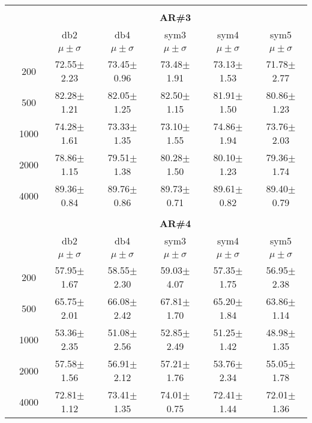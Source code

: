 \begin{table}[H]
\begin{tabular}{|c|c|c c c c c|}
\\ \midrule
\multicolumn{7}{c}{}\\ 



\cline{3-7}
\multicolumn{2}{c|}{\multirow{3}{*}{}} & \multicolumn{5}{c|}{\textbf{AR\#3}}   \\\cline{3-7} 

\multicolumn{2}{c|}{}  & db2 & db4 & sym3 & sym4 & sym5 \\\cline{3-7}
\multicolumn{2}{c|}{}& $\mu \pm \sigma$ & $\mu \pm \sigma$ & $\mu \pm \sigma$ & $\mu \pm \sigma$ & $\mu \pm \sigma$ \\\hline

\multicolumn{1}{|c|}{ \multirow{5}{*}{\rotatebox[origin=c]{90}{\textbf{Neurônios}}} }
&200	&72.55$\pm$2.23	&73.45$\pm$0.96	&73.48$\pm$1.91	&73.13$\pm$1.53 &71.78$\pm$2.77\\\cline{2-7}
&500	&82.28$\pm$1.21	&82.05$\pm$1.25	&82.50$\pm$1.15	&81.91$\pm$1.50	&80.86$\pm$1.23\\\cline{2-7}
&1000	&74.28$\pm$1.61	&73.33$\pm$1.35	&73.10$\pm$1.55	&74.86$\pm$1.94	&73.76$\pm$2.03\\\cline{2-7}
&2000	&78.86$\pm$1.15	&79.51$\pm$1.38	&80.28$\pm$1.50	&80.10$\pm$1.23	&79.36$\pm$1.74\\\cline{2-7}
&4000	&89.36$\pm$0.84	&89.76$\pm$0.86	&89.73$\pm$0.71	&89.61$\pm$0.82	&89.40$\pm$0.79



\\\midrule 
\multicolumn{7}{c}{}\\ 



\cline{3-7}
\multicolumn{2}{c|}{\multirow{3}{*}{}} & \multicolumn{5}{c|}{\textbf{AR\#4}}   \\\cline{3-7} 

\multicolumn{2}{c|}{}  & db2 & db4 & sym3 & sym4 & sym5 \\\cline{3-7}
\multicolumn{2}{c|}{}& $\mu \pm \sigma$ & $\mu \pm \sigma$ & $\mu \pm \sigma$ & $\mu \pm \sigma$ & $\mu \pm \sigma$ \\\hline

\multicolumn{1}{|c|}{ \multirow{5}{*}{\rotatebox[origin=c]{90}{\textbf{Neurônios}}} }
&200	&57.95$\pm$1.67	&58.55$\pm$2.30	&59.03$\pm$4.07	&57.35$\pm$1.75	&56.95$\pm$2.38\\\cline{2-7}
&500	&65.75$\pm$2.01	&66.08$\pm$2.42	&67.81$\pm$1.70	&65.20$\pm$1.84	&63.86$\pm$1.14\\\cline{2-7}
&1000	&53.36$\pm$2.35	&51.08$\pm$2.56	&52.85$\pm$2.49	&51.25$\pm$1.42	&48.98$\pm$1.35\\\cline{2-7}
&2000	&57.58$\pm$1.56 &56.91$\pm$2.12	&57.21$\pm$1.76	&53.76$\pm$2.34	&55.05$\pm$1.78\\\cline{2-7}
&4000	&72.81$\pm$1.12	&73.41$\pm$1.35	&74.01$\pm$0.75	&72.41$\pm$1.44	&72.01$\pm$1.36


\\\midrule
	\end{tabular}

\end{table} %

